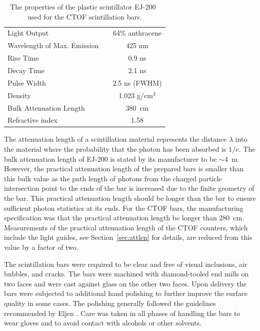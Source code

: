 \documentclass[3p,times,twocolumn]{elsarticle}
\begin{document}
\begin{table}[htbp]
\begin{center}
\begin{tabular}{l|c} \hline
Light Output                  & 64\% anthracene \\
Wavelength of Max. Emission~~ & 425 nm \\
Rise Time                     & 0.9 ns \\
Decay Time                    & 2.1 ns \\
Pulse Width                   & 2.5 ns (FWHM) \\
Density                       & 1.023 g/cm$^3$ \\
Bulk Attenuation Length       & 380~cm \\
Refractive index              & 1.58 \\ \hline 
\end{tabular}
\end{center}
\caption{The properties of the plastic scintillator EJ-200~\cite{eljen-ref} used for the CTOF scintillation
bars.}
\label{ej200-specs}
\end{table}

The attenuation length of a scintillation material represents the distance $\lambda$ into the material
where the probability that the photon has been absorbed is $1/e$.  The bulk attenuation length of EJ-200
is stated by its manufacturer to be $\sim$4~m. However, the practical attenuation length of the prepared
bars is smaller than this bulk value as the path length of photons from the charged particle intersection
point to the ends of the bar is increased due to the finite geometry of the bar. This practical attenuation
length should be longer than the bar to ensure sufficient photon statistics at its ends. For the CTOF bars,
the manufacturing specification was that the practical attenuation length be longer than 280~cm.
Measurements of the practical attenuation length of the CTOF counters, which include the light guides,
see Section~\ref{sec:attlen} for details, are reduced from this value by a factor of two.

The scintillation bars were required to be clear and free of visual inclusions, air bubbles, and cracks. The
bars were machined with diamond-tooled end mills on two faces and were cast against glass on the other
two faces. Upon delivery the bars were subjected to additional hand polishing to further improve the
surface quality in some cases. The polishing generally followed the guidelines recommended by Eljen
\cite{eljen-guide}. Care was taken in all phases of handling the bars to wear gloves and to avoid contact
with alcohols or other solvents.
\end{document}
